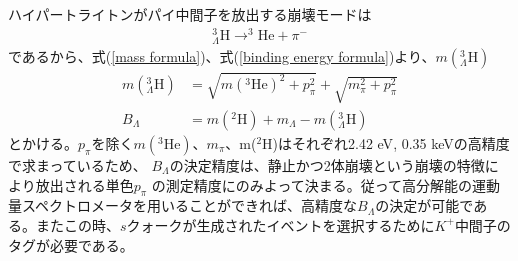 \documentclass[a4paper,11pt,uplatex]{jsbook}
\begin{document}
ハイパートライトンがパイ中間子を放出する崩壊モードは
\begin{eqnarray}
  ^3_{\Lambda}\text{H} \rightarrow ^3\text{He} + \pi^-
\end{eqnarray}
であるから、式(\ref{mass formula})、式(\ref{binding energy formula})より、$m(^3_\Lambda\text{H})$
\begin{eqnarray}
  m(^3_\Lambda \text{H}) &= \sqrt{m(^3\text{He})^2 + p^2_\pi} + \sqrt{m_\pi^2 + p_\pi^2} \\
  B_\Lambda &= m(^2\text{H}) + m_\Lambda - m(^3_\Lambda \text{H})
\end{eqnarray}
とかける。$p_\pi$を除く$m(^3\text{He})$、$m_\pi$、m($^2\text{H}$)はそれぞれ2.42 eV\cite{Audi}, 0.35 keV\cite{Beringer}の高精度で求まっているため、
$B_\Lambda$の決定精度は、静止かつ2体崩壊という崩壊の特徴により放出される単色$p_\pi$
の測定精度にのみよって決まる。従って高分解能の運動量スペクトロメータを用いることができれば、高精度な$B_\Lambda$の決定が可能である。またこの時、$s$クォークが生成されたイベントを選択するために$K^+$中間子のタグが必要である。
\end{document}
